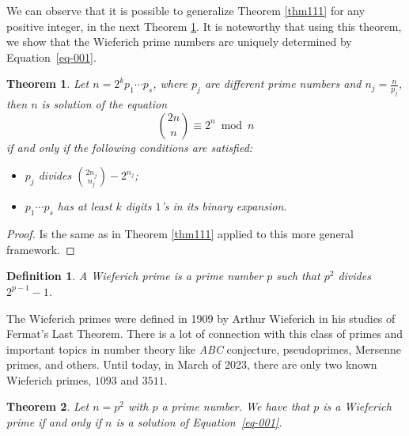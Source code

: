\documentclass[11pt,a4paper]{article}
\newtheorem{theorem}{Theorem}[section]
\newtheorem{definition}{Definition}[section]
\begin{document}
We can observe that it is possible to generalize Theorem \ref{thm111} for any positive integer, in the next Theorem \ref{thm444}. It is noteworthy that using this theorem, we show that the Wieferich prime numbers are uniquely determined by Equation~\eqref{eq-001}.






\begin{theorem}\label{thm444}
Let $n=2^k p_1\cdots p_s$, where $p_j$ are different prime numbers and $n_j=\frac{n}{p_j}$, then $n$ is solution of the equation
\begin{equation}
\binom{2n}{n} \equiv 2^n \bmod n 
\end{equation}
if and only if the following conditions  %
are satisfied:
\begin{itemize}
    \item [a)] $p_j$ divides $\binom{2n_j}{n_j}-2^{n_j}$;
    \item [b)] $p_1\cdots p_s$ has at least $k$ digits $1$'s in its binary expansion.
\end{itemize}
\end{theorem}
\begin{proof}
Is the same as in Theorem \ref{thm111} applied to this more general framework.
\end{proof}



\begin{definition}
A {\em Wieferich prime} is a prime number $p$ such that $p^2$ divides $2^{p-1}-1$.
\end{definition}

\smallskip

The Wieferich primes were defined in 1909  by Arthur Wieferich in his studies of Fermat's Last Theorem.  There is a lot of connection with this class of primes and important topics in number theory like {\it ABC} conjecture, pseudoprimes,  Mersenne primes, and others. Until today, in March of 2023, there are only two known Wieferich primes, $1093$ and $3511$.
\begin{theorem}\label{teo-32}
Let $n=p^2$ with $p$ a prime number. We have that
$p$ is a Wieferich prime if and only if  $n$ is a solution of Equation~\eqref{eq-001}.
\end{theorem}
\end{document}
